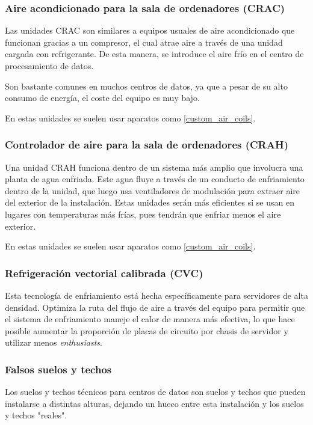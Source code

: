 \subsubsection{Aire acondicionado para la sala de ordenadores (CRAC)}

Las unidades CRAC son similares a equipos usuales de aire acondicionado que funcionan gracias a un compresor, el cual atrae aire a través de una unidad cargada con refrigerante. De esta manera, se introduce el aire frío en el centro de procesamiento de datos.

Son bastante comunes en muchos centros de datos, ya que a pesar de su alto consumo de energía, el coste del equipo es muy bajo.

En estas unidades se suelen usar aparatos como \eqref{custom_air_coils}.

\subsubsection{Controlador de aire para la sala de ordenadores (CRAH)}

Una unidad CRAH funciona dentro de un sistema más amplio que involucra una planta de agua enfriada. Este agua fluye a través de un conducto de enfriamiento dentro de la unidad, que luego usa ventiladores de modulación para extraer aire del exterior de la instalación. Estas unidades serán más eficientes si se usan en lugares con temperaturas más frías, pues tendrán que enfriar menos el aire exterior.

En estas unidades se suelen usar aparatos como \eqref{custom_air_coils}.

\subsubsection{Refrigeración vectorial calibrada (CVC)}

Esta tecnología de enfriamiento está hecha específicamente para servidores de alta densidad. Optimiza la ruta del flujo de aire a través del equipo para permitir que el sistema de enfriamiento maneje el calor de manera más efectiva, lo que hace posible aumentar la proporción de placas de circuito por chasis de servidor y utilizar menos \textit{enthusiasts}.

\subsubsection{Falsos suelos y techos}

Los suelos y techos técnicos para centros de datos son suelos y techos que pueden instalarse a distintas alturas, dejando un hueco entre esta instalación y los suelos y techos "reales".

